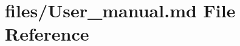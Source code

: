 \hypertarget{User__manual_8md}{}\section{files/\+User\+\_\+manual.md File Reference}
\label{User__manual_8md}
